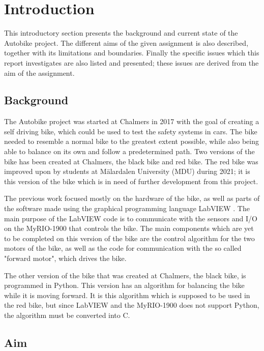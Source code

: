\chapter{Introduction}

This introductory section presents the background and current state of the Autobike project. The different aims of the given assignment is also described, together with its limitations and boundaries. Finally the specific issues which this report investigates are also listed and presented; these issues are derived from the aim of the assignment.

\section{Background}

The Autobike project was started at Chalmers in 2017 with the goal of creating a self driving bike, which could be used to test the safety systems in cars. The bike needed to resemble a normal bike to the greatest extent possible, while also being able to balance on its own and follow a predetermined path. Two versions of the bike has been created at Chalmers, the black bike and red bike. The red bike was improved upon by students at Mälardalen University (MDU) during 2021; it is this version of the bike which is in need of further development from this project.

The previous work focused mostly on the hardware of the bike, as well as parts of the software made using the graphical programming language LabVIEW \cite{NationalInstruments2022WhatLabVIEW}. The main purpose of the LabVIEW code is to communicate with the sensors and I/O on the MyRIO-1900 \cite{NationalInstruments2022MyRIO-1900} that controls the bike. The main components which are yet to be completed on this version of the bike are the control algorithm for the two motors of the bike, as well as the code for communication with the so called "forward motor", which drives the bike.

The other version of the bike that was created at Chalmers, the black bike, is programmed in Python. This version has an algorithm for balancing the bike while it is moving forward. It is this algorithm which is supposed to be used in the red bike, but since LabVIEW and the MyRIO-1900 does not support Python, the algorithm must be converted into C.

\section{Aim}

